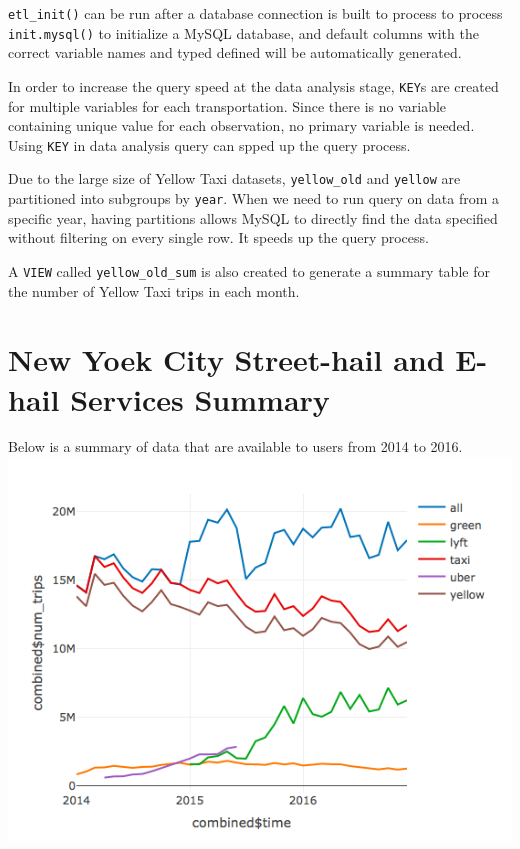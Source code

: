 \documentclass[12pt,twoside]{reedthesis}
\newenvironment{Shaded}{\begin{snugshade}}{\end{snugshade}}
\newcommand{\KeywordTok}[1]{\textcolor[rgb]{0.13,0.29,0.53}{\textbf{#1}}}
\newcommand{\DataTypeTok}[1]{\textcolor[rgb]{0.13,0.29,0.53}{#1}}
\newcommand{\StringTok}[1]{\textcolor[rgb]{0.31,0.60,0.02}{#1}}
\newcommand{\OperatorTok}[1]{\textcolor[rgb]{0.81,0.36,0.00}{\textbf{#1}}}
\newcommand{\NormalTok}[1]{#1}
\theoremstyle{definition}
\theoremstyle{definition}
\theoremstyle{definition}
\theoremstyle{remark}
\begin{document}
\texttt{etl\_init()} can be run after a database connection is built to
process to process \texttt{init.mysql()} to initialize a MySQL database,
and default columns with the correct variable names and typed defined
will be automatically generated.
\begin{Shaded}
\end{Shaded}
In order to increase the query speed at the data analysis stage,
\texttt{KEY}s are created for multiple variables for each
transportation. Since there is no variable containing unique value for
each observation, no primary variable is needed. Using \texttt{KEY} in
data analysis query can spped up the query process.

Due to the large size of Yellow Taxi datasets, \texttt{yellow\_old} and
\texttt{yellow} are partitioned into subgroups by \texttt{year}. When we
need to run query on data from a specific year, having partitions allows
MySQL to directly find the data specified without filtering on every
single row. It speeds up the query process.

A \texttt{VIEW} called \texttt{yellow\_old\_sum} is also created to
generate a summary table for the number of Yellow Taxi trips in each
month.

\section{New Yoek City Street-hail and E-hail Services
Summary}\label{new-yoek-city-street-hail-and-e-hail-services-summary}

Below is a summary of data that are available to users from 2014 to
2016. \includegraphics{figure/Num_trips_summary.png}
\end{document}
